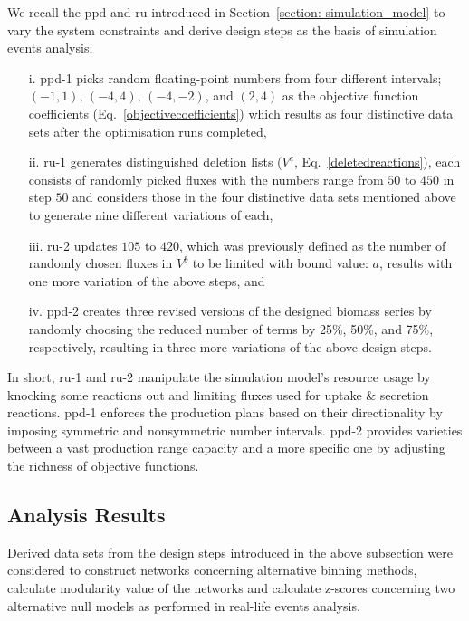 We recall the \acf{ppd} and \acf{ru} introduced in Section~\ref{section: simulation_model} to vary the system constraints and derive design steps as the basis of simulation events analysis;
\begin{itemize}
	\item[i.] \acs{ppd}-1 picks random floating-point numbers from four different intervals; $(-1, 1)$, $(-4, 4)$, $(-4, -2)$, and $(2, 4)$ as the objective function coefficients (Eq.~\ref{objectivecoefficients}) which results as four distinctive data sets after the optimisation runs completed,
	\item[ii.] \acs{ru}-1 generates distinguished deletion lists ($V^{e}$, Eq.~\ref{deletedreactions}), each consists of randomly picked fluxes with the numbers range from $50$ to $450$ in step $50$ and considers those in the four distinctive data sets mentioned above to generate nine different variations of each,
	\item[iii.] \acs{ru}-2 updates $105$ to $420$, which was previously defined as the number of randomly chosen fluxes in $V^{b}$ to be limited with bound value: $a$, results with one more variation of the above steps, and
	\item[iv.] \acs{ppd}-2 creates three revised versions of the designed biomass series by randomly choosing the reduced number of terms by 25\%, 50\%, and 75\%, respectively, resulting in three more variations of the above design steps.
\end{itemize}

In short, \acs{ru}-1 and \acs{ru}-2 manipulate the simulation model's resource usage by knocking some reactions out and limiting fluxes used for uptake \& secretion reactions. \acs{ppd}-1 enforces the production plans based on their directionality by imposing symmetric and nonsymmetric number intervals. \acs{ppd}-2 provides varieties between a vast production range capacity and a more specific one by adjusting the richness of objective functions. %

\subsection{Analysis Results}
Derived data sets from the design steps introduced in the above subsection were considered to construct networks concerning alternative binning methods, calculate modularity value of the networks and calculate z-scores concerning two alternative null models as performed in real-life events analysis.


